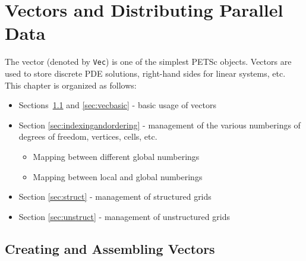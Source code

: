 %
%

\chapter{Vectors and Distributing Parallel Data} 
\label{chapter:vectors}

The vector (denoted by {\tt Vec}) is one of the simplest PETSc
objects.  Vectors are used to store discrete PDE solutions, right-hand
sides for linear systems, etc. This chapter is organized as follows:

\begin{itemize}
\item Sections~\ref{sec:veccreate} and \ref{sec:vecbasic} - basic usage of vectors
\item Section \ref{sec:indexingandordering} - management of the various numberings of
               degrees of freedom, vertices, cells, etc.
  \begin{itemize} 
  \item Mapping between different global numberings
  \item Mapping between local and global numberings
  \end{itemize}
\item Section \ref{sec:struct} - management of structured grids
\item Section \ref{sec:unstruct} - management of unstructured grids
\end{itemize}

\section{Creating and Assembling Vectors}
\label{sec:veccreate}

